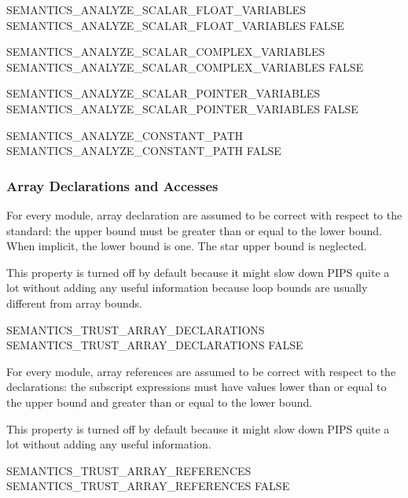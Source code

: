 \documentclass[a4paper]{report}
\begin{document}
\begin{PipsProp}{SEMANTICS_ANALYZE_SCALAR_FLOAT_VARIABLES}
SEMANTICS_ANALYZE_SCALAR_FLOAT_VARIABLES FALSE
\end{PipsProp}

\begin{PipsProp}{SEMANTICS_ANALYZE_SCALAR_COMPLEX_VARIABLES}
SEMANTICS_ANALYZE_SCALAR_COMPLEX_VARIABLES FALSE
\end{PipsProp}

\begin{PipsProp}{SEMANTICS_ANALYZE_SCALAR_POINTER_VARIABLES}
SEMANTICS_ANALYZE_SCALAR_POINTER_VARIABLES FALSE
\end{PipsProp}

\begin{PipsProp}{SEMANTICS_ANALYZE_CONSTANT_PATH}
SEMANTICS_ANALYZE_CONSTANT_PATH FALSE
\end{PipsProp}


\subsubsection{Array Declarations and Accesses}
\label{subsubsection:array-declarations-and-accesses}

For every module, array declaration are assumed to be correct with respect
to the standard: the upper bound must be greater than or equal to the
lower bound. When implicit, the lower bound is one. The star upper bound
is neglected.

This property is turned off by default because it might slow down PIPS
quite a lot without adding any useful information because loop bounds are
usually different from array bounds.

\begin{PipsProp}{SEMANTICS_TRUST_ARRAY_DECLARATIONS}
SEMANTICS_TRUST_ARRAY_DECLARATIONS FALSE
\end{PipsProp}

For every module, array references are assumed to be correct with respect
to the declarations: the subscript expressions must have values lower than
or equal to the upper bound and greater than or equal to the lower bound.

This property is turned off by default because it might slow down PIPS
quite a lot without adding any useful information.

\begin{PipsProp}{SEMANTICS_TRUST_ARRAY_REFERENCES}
SEMANTICS_TRUST_ARRAY_REFERENCES FALSE
\end{PipsProp}
\end{document}

